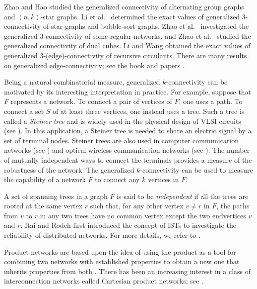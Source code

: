 \documentclass[final]{dmtcs-episciences}
\begin{document}
Zhao and Hao \cite{ZhaoHao} studied the generalized connectivity of
alternating group graphs and $(n,k)$-star graphs. Li et al.~\cite{LiTuYu} determined the exact values of generalized $3$-connectivity
of star graphs and bubble-sort graphs. Zhao et al.~\cite{ZhaoHaoWu}
investigated the generalized $3$-connectivity of some regular
networks, and Zhao et al.~\cite{ZhaoHaoCheng} studied the
generalized connectivity of dual cubes. Li and Wang \cite{LiWang}
obtained the exact values of generalized $3$-(edge)-connectivity of
recursive circulants. There are many results on generalized
edge-connectivity; see the book \cite{LMbook} and papers
\cite{LiWang, LiLiSun, LiMaYangWang, LiMaoExtremal, LiMaoProduct,
LiMaoNordhaus, LiTuYu, LinZhang, Sun}.


Being a natural combinatorial measure, generalized $k$-connectivity
can be motivated by its interesting interpretation in practice. For
example, suppose that $F$ represents a network. To connect a pair of vertices of $F$, one uses a path. To connect a set $S$
of at least three vertices, one instead uses a tree.
Such a tree is called a \emph{Steiner tree} and is widely used in the physical design of VLSI circuits (see
\cite{Grotschel, GrotschelMartinWeismantel, Sherwani}). In this
application, a Steiner tree is needed to share an electric signal by
a set of terminal nodes. Steiner trees are also used in computer
communication networks (see \cite{Du}) and optical wireless
communication networks (see \cite{Cheng}). The number of mutually independent ways to connect the terminals provides a
measure of the robustness of the network. The generalized $k$-connectivity can be used to measure the capability of a network $F$ to connect any $k$
vertices in $F$.

A set of spanning trees in a graph $F$ is said to be
\emph{independent} if all the trees are rooted at the same vertex $r$
such that, for any other vertex $v\neq r$ in $F$, the paths from
$v$ to $r$ in any two trees have no common vertex except the two
endvertices $v$ and $r$. Itai and Rodeh \cite{ItaiRodeh} first introduced
the concept of ISTs to investigate the reliability of distributed
networks. For more details, we refer to \cite{ItaiRodeh,
YangChangPaiChan, YangChangTangWang}.


Product networks are based upon the idea of using the product as a
tool for combining two networks with established properties to
obtain a new one that inherits properties from both
\cite{DayAl-Ayyoub}. There has been an increasing interest in a
class of interconnection networks called Cartesian product networks;
see \cite{DayAl-Ayyoub, Hammack, KuWangHung}.
\end{document}
